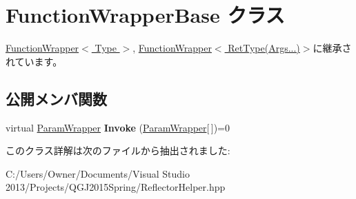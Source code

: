 \hypertarget{class_function_wrapper_base}{}\section{Function\+Wrapper\+Base クラス}
\label{class_function_wrapper_base}


\hyperlink{class_function_wrapper}{Function\+Wrapper$<$ Type $>$}, \hyperlink{class_function_wrapper_3_01_ret_type_07_args_8_8_8_08_4}{Function\+Wrapper$<$ Ret\+Type(\+Args...)$>$}に継承されています。

\subsection*{公開メンバ関数}
\begin{DoxyCompactItemize}
\item 
virtual \hyperlink{struct_param_wrapper}{Param\+Wrapper} {\bfseries Invoke} (\hyperlink{struct_param_wrapper}{Param\+Wrapper}\mbox{[}$\,$\mbox{]})=0\hypertarget{class_function_wrapper_base_afeac43cc3225cbb878556c75ef43c43c}{}\label{class_function_wrapper_base_afeac43cc3225cbb878556c75ef43c43c}

\end{DoxyCompactItemize}


このクラス詳解は次のファイルから抽出されました\+:\begin{DoxyCompactItemize}
\item 
C\+:/\+Users/\+Owner/\+Documents/\+Visual Studio 2013/\+Projects/\+Q\+G\+J2015\+Spring/Reflector\+Helper.\+hpp\end{DoxyCompactItemize}
